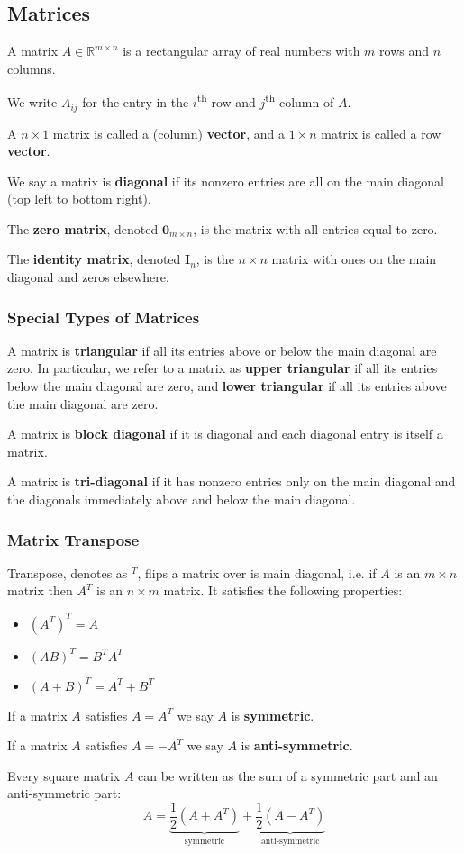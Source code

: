 \documentclass[11pt]{article}
\begin{document}
\subsection{Matrices} 
A matrix $A \in \mathbb{R}^{m\times n}$ is a rectangular array of real numbers with $m$ rows and $n$ columns. \par
We write $A_{ij}$ for the entry in the $i$\textsuperscript{th} row and $j$\textsuperscript{th} column of $A$. \par
A $n \times 1$ matrix is called a (column) \textbf{vector}, and a $1 \times n$ matrix is called a row \textbf{vector}. \par 

We say a matrix is \textbf{diagonal} if its nonzero entries are all on the main diagonal (top left to bottom right). \par
The \textbf{zero matrix}, denoted $\bm{0}_{m\times n}$, is the matrix with all entries equal to zero. \par
The \textbf{identity matrix}, denoted $\bm{I}_n$, is the $n \times n$ matrix with ones on the main diagonal and zeros elsewhere. \par

\subsubsection*{Special Types of Matrices}
A matrix is \textbf{triangular} if all its entries above or below the main diagonal are zero. In particular, we refer to a matrix as \textbf{upper triangular} if all its entries below the main diagonal are zero, and \textbf{lower triangular} if all its entries above the main diagonal are zero. \par
A matrix is \textbf{block diagonal} if it is diagonal and each diagonal entry is itself a matrix. \par
A matrix is \textbf{tri-diagonal} if it has nonzero entries only on the main diagonal and the diagonals immediately above and below the main diagonal. \par

\subsubsection*{Matrix Transpose}
Transpose, denotes as $^T$, flips a matrix over is main diagonal, i.e. if $A$ is an $m \times n$ matrix then $A^T$ is an $n \times m$ matrix. It satisfies the following properties: 
\begin{itemize}
    \item $(A^T)^T = A$
    \item $(AB)^T = B^TA^T$
    \item $(A+B)^T = A^T + B^T$
\end{itemize}
If a matrix $A$ satisfies $A = A^T$ we say $A$ is \textbf{symmetric}. \par 
If a matrix $A$ satisfies $A = -A^T$ we say $A$ is \textbf{anti-symmetric}. \par 
Every square matrix $A$ can be written as the sum of a symmetric part and an anti-symmetric part: 
\[ A = \underbrace{\frac{1}{2}\left( A + A^T \right)}_{\text{symmetric}} + \underbrace{\frac{1}{2}\left( A - A^T \right)}_{\text{anti-symmetric}} \] 
\end{document}
